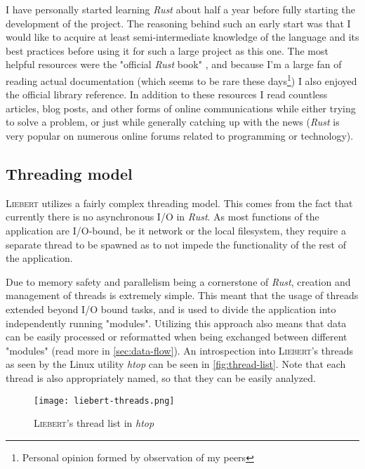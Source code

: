         I have personally started learning \textit{Rust} about half a year before fully starting the development of the project. The reasoning behind such an early start was that I would like to acquire at least semi-intermediate knowledge of the language and its best practices before using it for such a large project as this one. The most helpful resources were the "official \textit{Rust} book" \cite{rust-book}, and because I'm a large fan of reading actual documentation (which seems to be rare these days\footnote{Personal opinion formed by observation of my peers}) I also enjoyed the official library reference. In addition to these resources I read countless articles, blog posts, and other forms of online communications while either trying to solve a problem, or just while generally catching up with the news (\textit{Rust} is very popular on numerous online forums related to programming or technology).
        
    \subsection{Threading model}\label{sec:threads}
        \textsc{Liebert} utilizes a fairly complex threading model. This comes from the fact that currently there is no asynchronous I/O in \textit{Rust}. As most functions of the application are I/O-bound, be it network or the local filesystem, they require a separate thread to be spawned as to not impede the functionality of the rest of the application.
        
        Due to memory safety and parallelism being a cornerstone of \textit{Rust}, creation and management of threads is extremely simple. This meant that the usage of threads extended beyond I/O bound tasks, and is used to divide the application into independently running "modules". Utilizing this approach also means that data can be easily processed or reformatted when being exchanged between different "modules" (read more in \autoref{sec:data-flow}). An introspection into \textsc{Liebert}'s threads as seen by the Linux utility \textit{htop} can be seen in \autoref{fig:thread-list}. Note that each thread is also appropriately named, so that they can be easily analyzed.
    
            \begin{figure}[!htb]
                \centering
                \texttt{[image: liebert-threads.png]}
                \caption{\textsc{Liebert}'s thread list in \textit{htop}}
                \label{fig:thread-list}
            \end{figure}
        
